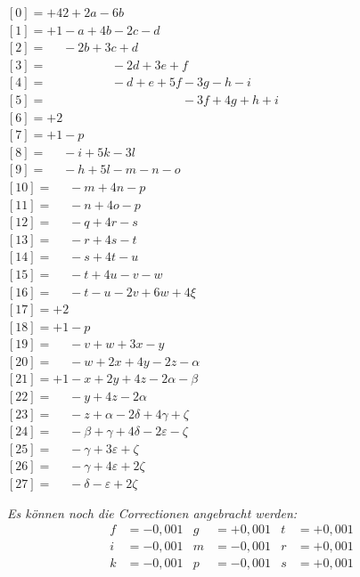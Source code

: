\documentclass[12pt,a4paper]{article}
\theoremstyle{plain}
\theoremstyle{definition}
\theoremstyle{remark}
\begin{document}
\medskip
\noindent
$[0] = +42 + 2a - 6b$\\
$[1] = +1 - a + 4b - 2c - d$\\
$[2] = \phantom{+1} - 2b + 3c + d$\\
$[3] = \phantom{+1 - a + 4b} - 2d + 3e + f$\\
$[4] = \phantom{+1 - a + 4b} - d + e + 5f - 3g - h - i$\\
$[5] = \phantom{+1 - a + 4b - d + e + 5f} - 3f + 4g + h + i$\\
$[6] = +2$\\
$[7] = +1 - p$\\
$[8] = \phantom{+1} - i + 5k - 3l$\\
$[9] = \phantom{+1} - h + 5l - m - n - o$\\
$[10] = \phantom{+1} - m + 4n - p$\\
$[11] = \phantom{+1} - n + 4o - p$\\
$[12] = \phantom{+1} - q + 4r - s$\\
$[13] = \phantom{+1} - r + 4s - t$\\
$[14] = \phantom{+1} - s + 4t - u$\\
$[15] = \phantom{+1} - t + 4u - v - w$\\
$[16] = \phantom{+1} - t - u - 2v + 6w + 4\xi$\\
$[17] = +2$\\
$[18] = +1 - p$\\
$[19] = \phantom{+1} - v + w + 3x - y$\\
$[20] = \phantom{+1} - w + 2x + 4y - 2z - \alpha$\\
$[21] = +1 - x + 2y + 4z - 2\alpha - \beta$\\
$[22] = \phantom{+1} - y + 4z - 2\alpha$\\
$[23] = \phantom{+1} - z + \alpha - 2\delta + 4\gamma + \zeta$\\
$[24] = \phantom{+1} - \beta + \gamma + 4\delta - 2\varepsilon - \zeta$\\
$[25] = \phantom{+1} - \gamma + 3\varepsilon + \zeta$\\
$[26] = \phantom{+1} - \gamma + 4\varepsilon + 2\zeta$\\
$[27] = \phantom{+1} - \delta - \varepsilon + 2\zeta$

\medskip
\noindent
\textit{Es k\"onnen noch die Correctionen angebracht werden:}
\begin{align*}
f &= -0{,}001 & g &= +0{,}001 & t &= +0{,}001 \\
i &= -0{,}001 & m &= -0{,}001 & r &= +0{,}001 \\
k &= -0{,}001 & p &= -0{,}001 & s &= +0{,}001
\end{align*}
\end{document}
